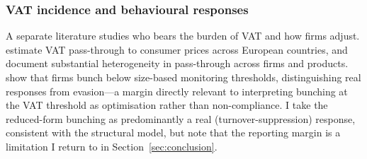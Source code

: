 \subsubsection{VAT incidence and behavioural responses}

A separate literature studies who bears the burden of VAT and how firms adjust.
\citet{benedek2015} estimate VAT pass-through to consumer prices across European
countries, and \citet{belloncopestake2022} document substantial heterogeneity in
pass-through across firms and products. \citet{almunialopezrodriguez2018} show that
firms bunch below size-based monitoring thresholds, distinguishing real responses from
evasion---a margin directly relevant to interpreting bunching at the VAT threshold as
optimisation rather than non-compliance. I take the reduced-form bunching as
predominantly a real (turnover-suppression) response, consistent with the structural
model, but note that the reporting margin is a limitation I return to in
Section~\ref{sec:conclusion}.
